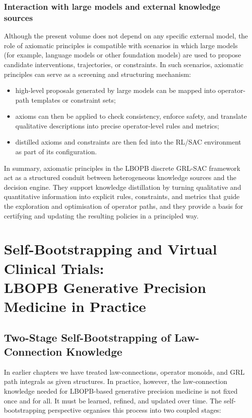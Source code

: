 \documentclass[11pt]{book}
\theoremstyle{plain}
\theoremstyle{definition}
\theoremstyle{remark}
\begin{document}
\subsection*{Interaction with large models and external knowledge sources}

Although the present volume does not depend on any specific external
model, the role of axiomatic principles is compatible with scenarios
in which large models (for example, language models or other
foundation models) are used to propose candidate interventions,
trajectories, or constraints. In such scenarios, axiomatic principles
can serve as a screening and structuring mechanism:

\begin{itemize}
  \item high-level proposals generated by large models can be mapped
        into operator-path templates or constraint sets;
  \item axioms can then be applied to check consistency, enforce
        safety, and translate qualitative descriptions into precise
        operator-level rules and metrics;
  \item distilled axioms and constraints are then fed into the RL/SAC
        environment as part of its configuration.
\end{itemize}

In summary, axiomatic principles in the LBOPB discrete GRL-SAC
framework act as a structured conduit between heterogeneous knowledge
sources and the decision engine. They support knowledge distillation
by turning qualitative and quantitative information into explicit
rules, constraints, and metrics that guide the exploration and
optimisation of operator paths, and they provide a basis for
certifying and updating the resulting policies in a principled way.

\chapter[Self-Bootstrapping and Virtual Clinical Trials]{Self-Bootstrapping and Virtual Clinical Trials:\\
         LBOPB Generative Precision Medicine in Practice}


\section{Two-Stage Self-Bootstrapping of Law-Connection Knowledge}


In earlier chapters we have treated law-connections, operator monoids,
and GRL path integrals as given structures. In practice, however, the
law-connection knowledge needed for LBOPB-based generative precision
medicine is not fixed once and for all. It must be learned, refined,
and updated over time. The self-bootstrapping perspective organises
this process into two coupled stages:
\end{document}
